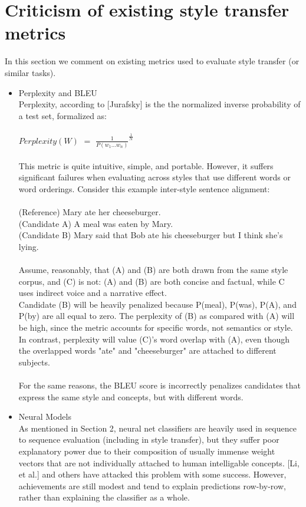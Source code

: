 \documentclass[letterpaper, 10 pt, conference]{ieeeconf}  %
\begin{document}
\section{Criticism of existing style transfer metrics}
In this section we comment on existing metrics used to evaluate style transfer (or similar tasks).
\begin{itemize}
  \item{ Perplexity and BLEU}
  \\
  Perplexity, according to [Jurafsky] is the the normalized inverse probability of a test set, formalized as:
  \\
  \\
  $Perplexity(W) $ $=$ $\frac{1}{P(w_1 \ldots w_n)}^{\frac{1}{N}}$
  \\
  \\
  This metric is quite intuitive, simple, and portable. However, it suffers significant failures when evaluating across styles that use different words or word orderings. Consider this example inter-style sentence alignment:\\
  \\
  (Reference) Mary ate her cheeseburger.\\
  (Candidate A) A meal was eaten by Mary.\\
  (Candidate B) Mary said that Bob ate his cheeseburger but I think she's lying.\\
  \\
  Assume, reasonably, that (A) and (B) are both drawn from the same style corpus, and (C) is not: (A) and (B) are both concise and factual, while C uses indirect voice and a narrative effect.
  \\
  Candidate (B) will be heavily penalized because P(meal), P(was), P(A), and P(by) are all equal to zero.  The perplexity of (B) as compared with (A) will be high, since the metric accounts for specific words, not semantics or style. In contrast, perplexity will value (C)'s word overlap with (A), even though the overlapped words "ate" and "cheeseburger" are attached to different subjects.
  \\
  \\
  For the same reasons, the BLEU score is incorrectly penalizes candidates that express the same style and concepts, but with different words. \\

  \item{Neural Models}\\ As mentioned in Section 2, neural net classifiers are heavily used in sequence to sequence evaluation (including in style transfer), but they suffer poor explanatory power due to their composition of usually immense weight vectors that are not individually attached to human intelligable concepts. [Li, et al.] and others have attacked this problem with some success. However, achievements are still modest and tend to explain predictions row-by-row, rather than explaining the classifier as a whole. \\


\end{itemize}
\end{document}
